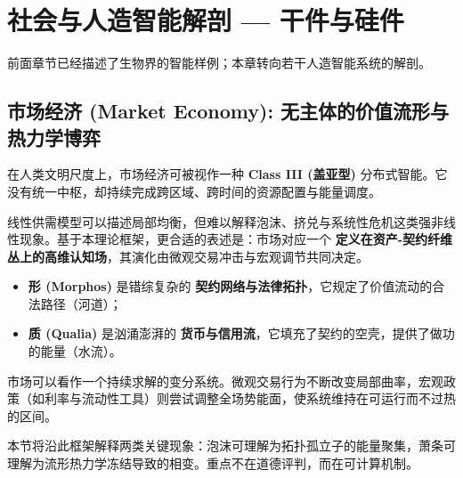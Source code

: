 \chapter{社会与人造智能解剖 — 干件与硅件}
\label{chp:social_artificial_intelligence}

前面章节已经描述了生物界的智能样例；本章转向若干人造智能系统的解剖。

\section{市场经济 (Market Economy): 无主体的价值流形与热力学博弈}
\label{sec:section_4093}

在人类文明尺度上，市场经济可被视作一种 \textbf{Class III (盖亚型)} 分布式智能。它没有统一中枢，却持续完成跨区域、跨时间的资源配置与能量调度。

线性供需模型可以描述局部均衡，但难以解释泡沫、挤兑与系统性危机这类强非线性现象。基于本理论框架，更合适的表述是：市场对应一个 \textbf{定义在资产-契约纤维丛上的高维认知场}，其演化由微观交易冲击与宏观调节共同决定。

\begin{itemize}
    \item   \textbf{形 (Morphos)} 是错综复杂的 \textbf{契约网络与法律拓扑}，它规定了价值流动的合法路径（河道）；
    \item   \textbf{质 (Qualia)} 是汹涌澎湃的 \textbf{货币与信用流}，它填充了契约的空壳，提供了做功的能量（水流）。
\end{itemize}

市场可以看作一个持续求解的变分系统。微观交易行为不断改变局部曲率，宏观政策（如利率与流动性工具）则尝试调整全场势能面，使系统维持在可运行而不过热的区间。

本节将沿此框架解释两类关键现象：泡沫可理解为拓扑孤立子的能量聚集，萧条可理解为流形热力学冻结导致的相变。重点不在道德评判，而在可计算机制。





